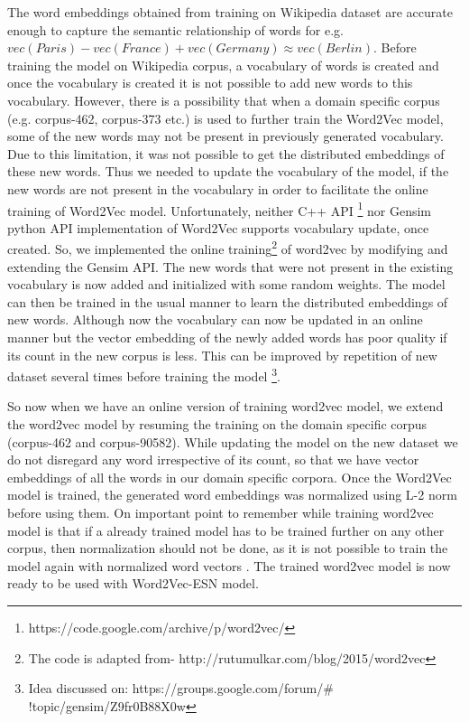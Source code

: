 The word embeddings obtained from training on Wikipedia dataset are accurate enough to capture the semantic relationship of words for e.g. $vec(Paris) -vec(France) + vec(Germany) \approx vec(Berlin)$. Before training the model on Wikipedia corpus, a vocabulary of words is created and once the vocabulary is created it is not possible to add new words to this vocabulary. However, there is a possibility that when a domain specific corpus (e.g. corpus-462, corpus-373 etc.) is used to further train the Word2Vec model, some of the new words may not be present in previously generated vocabulary. Due to this limitation, it was not possible to get the distributed embeddings of these new words. Thus we needed to update the vocabulary of the model, if the new words are not present in the vocabulary in order to facilitate the online training of Word2Vec model. Unfortunately, neither C++ API \footnote{https://code.google.com/archive/p/word2vec/} nor Gensim python API \cite{w2v:gensim_api} implementation of Word2Vec supports vocabulary update, once created. So, we implemented the online training\footnote{The code is adapted from-  http://rutumulkar.com/blog/2015/word2vec} of word2vec by modifying and extending the Gensim API. The new words that were not present in the existing vocabulary is now added and initialized with some random weights. The model can then be trained in the usual manner to learn the distributed  embeddings of new words. Although now the vocabulary can now be updated in an online manner but the vector embedding of the newly added words has poor quality if its count in the new corpus is less. This can be improved by repetition of new dataset several times before training the model \footnote{Idea discussed on: https://groups.google.com/forum/$\#$!topic/gensim/Z9fr0B88X0w}.

So now when we have an online version of training word2vec model, we extend the word2vec model by resuming the training on the domain specific corpus (corpus-462 and corpus-90582). While updating the model on the new dataset we do not disregard any word irrespective of its count, so that we have vector embeddings of all the words in our domain specific corpora. Once the Word2Vec model is trained, the generated word embeddings was normalized using L-2 norm before using them. On important point to remember while training word2vec model is that if a already trained model has to be trained further on any other corpus, then normalization should not be done, as it is not possible to train the model again with normalized word vectors \cite{w2v:gensim_api}. The trained word2vec model is now ready to be used with Word2Vec-ESN model.

